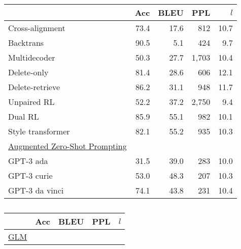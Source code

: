 \begin{table}
    \setlength{\tabcolsep}{2pt}
    \begin{subtable}{.58\linewidth}
    \centering \small 
        \begin{tabular}{l r r r r}
        \toprule
         & Acc & BLEU & PPL & $l$\\
        \midrule
        Cross-alignment \citep{NIPS2017_2d2c8394} & 73.4 & 17.6 & 812 & 10.7 \\
        Backtrans \citep{prabhumoye-etal-2018-style} & 90.5 & 5.1 & 424 & 9.7 \\
        Multidecoder \citep{AAAI1817015}  & 50.3 & 27.7 & 1,703 & 10.4 \\
        Delete-only \citep{li-etal-2018-delete} & 81.4 & 28.6 & 606 & 12.1 \\
        Delete-retrieve \citep{li-etal-2018-delete} & 86.2 & 31.1 & 948 & 11.7 \\
        Unpaired RL \citep{xu-etal-2018-unpaired} & 52.2 & 37.2 & 2,750 & 9.4 \\
        Dual RL \citep{DBLP:conf/ijcai/LuoLZYCSS19} & 85.9 & 55.1 & 982 & 10.1 \\
        Style transformer \citep{dai-etal-2019-style} & 82.1 & 55.2 & 935 & 10.3 \\
        \midrule
        \underline{Augmented Zero-Shot Prompting} \\
        GPT-3 ada & 31.5 & 39.0 & 283 & 10.0 \\
        GPT-3 curie  & 53.0 & 48.3 & 207 & 10.3 \\
        GPT-3 da vinci  & 74.1 & 43.8 & 231 & 10.4 \\
        \midrule
        \bottomrule
        \end{tabular}
        \label{tab:prior-methods}
        \caption{}
    \end{subtable}
    \begin{subtable}{.40\linewidth}
    \centering \small 
        \begin{tabular}{l r r r r}
        \toprule
         & Acc & BLEU & PPL & $l$\\
        \midrule
        \underline{GLM} \\

\end{tabular}
\end{subtable}
\end{table}
